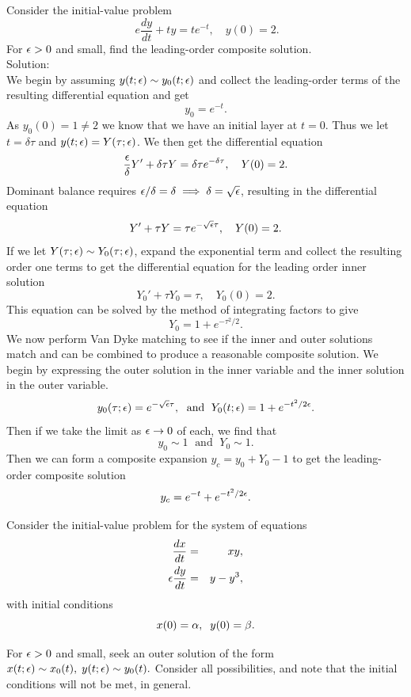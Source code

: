 \item
Consider the initial-value problem
\begin{equation*}\
e \frac{dy}{dt} +ty = t e^{-t}, \quad y(0) = 2.
\end{equation*}
For $\epsilon >0$ and small, find the leading-order composite solution.\\

Solution:\\

We begin by assuming $y(t;\epsilon)\sim y_0(t;\epsilon)$ and collect the leading-order terms of the resulting differential equation and get
$$y_0=e^{-t}.$$
As $y_0(0)=1\neq 2$ we know that we have an initial layer at $t=0$. Thus we let $t=\delta \tau$ and $y(t;\epsilon)=Y(\tau;\epsilon)$. We then get the differential equation
$$\frac{\epsilon}{\delta}Y'+\delta\tau Y=\delta\tau e^{-\delta \tau},\quad Y(0)=2.$$
Dominant balance requires $\epsilon/\delta=\delta\implies \delta=\sqrt{\epsilon}$, resulting in the differential equation
$$Y'+\tau Y=\tau e^{-\sqrt{\epsilon}\tau},\quad Y(0)=2.$$
If we let $Y(\tau;\epsilon)\sim Y_0(\tau;\epsilon)$, expand the exponential term and collect the resulting order one terms to get the differential equation for the leading order inner solution
$$Y_0'+\tau Y_0=\tau,\quad Y_0(0)=2.$$
This equation can be solved by the method of integrating factors to give
$$Y_0=1+e^{-\tau^2/2}.$$
We now perform Van Dyke matching to see if the inner and outer solutions match and can be combined to produce a reasonable composite solution. We begin by expressing the outer solution in the inner variable and the inner solution in the outer variable.
$$y_0(\tau;\epsilon)=e^{-\sqrt{\epsilon}\tau},\;\text{ and }\;Y_0(t;\epsilon)=1+e^{-t^2/2\epsilon}.$$
Then if we take the limit as $\epsilon\to 0$ of each, we find that
$$y_0\sim 1\;\text{ and }\; Y_0\sim 1.$$
Then we can form a composite expansion $y_c=y_0+Y_0-1$ to get the leading-order composite solution
$$y_c=e^{-t}+e^{-t^2/2\epsilon}.$$


\item Consider the initial-value problem for the system of equations
\begin{eqnarray*}
\frac{dx}{dt} &=& xy, \\
\epsilon \frac{dy}{dt} &=& y-y^3,
\end{eqnarray*}
with initial conditions
\begin{equation*}
x(0) = \alpha, \;\; y(0) = \beta.
\end{equation*}
\benum
\item For $\epsilon>0$ and small, seek an outer solution of the form $x(t;\epsilon) \sim x_0(t), \; y(t;\epsilon) \sim y_0(t).$  Consider all possibilities, and note that the initial conditions will not be met, in general.

